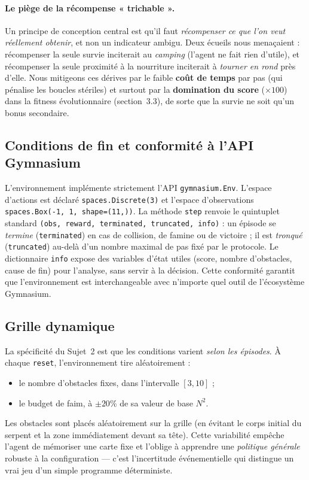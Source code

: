 \documentclass[11pt,a4paper]{article}
\begin{document}
\paragraph{Le piège de la récompense « trichable ».} Un principe de conception
central est qu'il faut \emph{récompenser ce que l'on veut réellement obtenir}, et
non un indicateur ambigu. Deux écueils nous menaçaient : récompenser la seule
survie inciterait au \emph{camping} (l'agent ne fait rien d'utile), et récompenser
la seule proximité à la nourriture inciterait à \emph{tourner en rond} près
d'elle. Nous mitigeons ces dérives par le faible \textbf{coût de temps} par pas
(qui pénalise les boucles stériles) et surtout par la \textbf{domination du score}
($\times 100$) dans la fitness évolutionnaire (section~3.3), de sorte que la survie
ne soit qu'un bonus secondaire.

\subsection{Conditions de fin et conformité à l'API Gymnasium}
L'environnement implémente strictement l'API \texttt{gymnasium.Env}. L'espace
d'actions est déclaré \texttt{spaces.Discrete(3)} et l'espace d'observations
\texttt{spaces.Box(-1, 1, shape=(11,))}. La méthode \texttt{step} renvoie le
quintuplet standard \texttt{(obs, reward, terminated, truncated, info)} : un épisode
se \emph{termine} (\texttt{terminated}) en cas de collision, de famine ou de
victoire ; il est \emph{tronqué} (\texttt{truncated}) au-delà d'un nombre maximal de
pas fixé par le protocole. Le dictionnaire \texttt{info} expose des variables d'état
utiles (score, nombre d'obstacles, cause de fin) pour l'analyse, sans servir à la
décision. Cette conformité garantit que l'environnement est interchangeable avec
n'importe quel outil de l'écosystème Gymnasium.

\subsection{Grille dynamique}
La spécificité du Sujet~2 est que les conditions varient \emph{selon les
épisodes}. À chaque \texttt{reset}, l'environnement tire aléatoirement :
\begin{itemize}[nosep]
  \item le nombre d'obstacles fixes, dans l'intervalle $[3, 10]$ ;
  \item le budget de faim, à $\pm 20\%$ de sa valeur de base $N^2$.
\end{itemize}
Les obstacles sont placés aléatoirement sur la grille (en évitant le corps initial
du serpent et la zone immédiatement devant sa tête). Cette variabilité empêche
l'agent de mémoriser une carte fixe et l'oblige à apprendre une \emph{politique
générale} robuste à la configuration — c'est l'incertitude événementielle qui
distingue un vrai jeu d'un simple programme déterministe.
\end{document}
